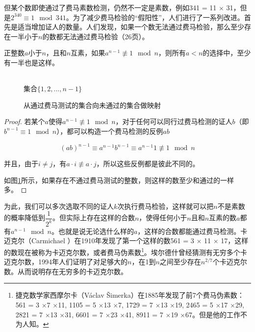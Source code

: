 \documentclass{article}
\begin{document}
但某个数即使通过了费马素数检测，仍然不一定是素数，例如341 = 11 $\times$ 31，但是$2^{340} \equiv 1 \mod 341$。为了减少费马检验的“假阳性”，人们进行了一系列改进。首先是适当增加证人的数量。人们发现，如果一个数无法通过费马检验，那么至少存在一半小于$n$的数都无法通过费马检验\cite{Algorithms-DPV}（26页）。

\begin{theorem}
正整数$a$小于$n$，且和$n$互素，如果$a^{n-1} \not\equiv 1 \mod n$，则所有$a<n$的选择中，至少有一半也是这样。
\end{theorem}

\begin{figure}[htbp]
\centering
{} \\
集合$\{1, 2, ..., n-1\}$
\caption{从通过费马测试的集合向未通过的集合做映射}
\label{fig:Fermat-test}
\end{figure}

\begin{proof}
若某个$a$使得$a^{n-1} \not\equiv 1 \mod n$，对于任何可以同行过费马检测的证人$b$（即$b^{n-1} \equiv 1 \mod n$），都可以构造一个费马检测的反例$ab$

\[
(ab)^{n-1} \equiv a^{n-1}b^{n-1} \equiv a^{n-1}1 \not\equiv 1 \mod n
\]

并且，由于$i \neq j$，有$a \cdot i \not\equiv a \cdot j$，所以这些反例都是彼此不同的。

如图\ref{fig:Fermat-test}所示，如果存在不通过费马测试的整数，则这样的数至少和通过的一样多。
\end{proof}

为此，我们可以多次选取不同的证人$k$次执行费马检验，这样就可以把$n$不是素数的概率降低到$\dfrac{1}{2^k}$。但实际上存在这样的合数$n$，使得任何小于$n$且和$n$互素的数$a$都有$a^{n-1} \mod n$。也就是说无论选什么样的$a$，这样的合数都能通过费马检测。卡迈克尔（Carmichael ）在1910年发现了第一个这样的数561 = 3 $\times$ 11 $\times$ 17，这样的数现在被称为卡迈克尔数，或者费马伪素数\footnote{捷克数学家西摩尔卡（Václav Šimerka）在1885年发现了前7个费马伪素数：561 = 3 $\times$7 $\times$11, 1105 = 5 $\times$13 $\times$7, 1729 = 7 $\times$13 $\times$19, 2465 = 5 $\times$17 $\times$29, 2821 = 7 $\times$13 $\times$31, 6601 = 7 $\times$23 $\times$41, 8911 = 7 $\times$19 $\times$67。但是他的工作不为人知。}。埃尔德什曾经猜测有无穷多个卡迈克尔数，1994年人们证明了对足够大的$n$，在1到$n$之间至少存在$n^{2/7}$个卡迈克尔数。从而说明存在无穷多的卡迈克尔数\cite{Wiki-Carmichael-number}。
\end{document}
